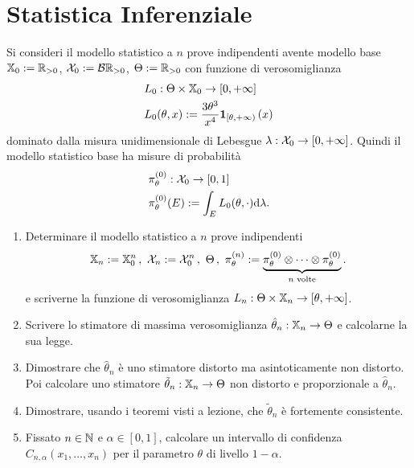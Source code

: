 

\section{Statistica Inferenziale}

\begin{esercizio}
  Si consideri il modello statistico a $n$ prove indipendenti avente modello base $\mathbb X_0 := \mathbb R_{> 0}$, $\mathcal X_0 := \mathcal B \mathbb R_{> 0}$, $\Theta := \mathbb R_{>0}$ con funzione di verosomiglianza
\begin{align*}
  & L_0 : \Theta \times \mathbb X_0 \to [0, +\infty] \\
  & L_0(\theta, x) := \frac{3 \theta^3}{x^4} \mathbf 1_{[\theta, +\infty)}\left(x\right)
\end{align*}
dominato dalla misura unidimensionale di Lebesgue $\lambda : \mathcal X_0 \to [0, +\infty]$. Quindi il modello statistico base ha misure di probabilità
\begin{align*}
  & \pi_\theta^{(0)} : \mathcal X_0 \to [0, 1] \\
  & \pi_\theta^{(0)}(E) := \int_E L_0(\theta,\cdot) \mathrm d\lambda .
\end{align*}
\begin{enumerate}[leftmargin=*]
\item Determinare il modello statistico a $n$ prove indipendenti
\[
	\mbb X_n := \mbb X_0^n\,,\ \mcal X_n := \mcal X_0^n\,,\ \Theta \,,\ \pi_\theta^{(n)} := \underbrace{\pi_\theta^{(0)} \otimes \cdots \otimes \pi_\theta^{(0)}}_{n \text{ volte}} .
\]
e scriverne la funzione di verosomiglianza $L_n : \Theta \times \mathbb X_n \to [\theta, +\infty]$.

\item Scrivere lo stimatore di massima verosomiglianza $\hat\theta_n : \mathbb X_n \to \Theta$ e calcolarne la sua legge.

\item Dimostrare che $\hat\theta_n$ è uno stimatore distorto ma asintoticamente non distorto. Poi calcolare uno stimatore $\tilde\theta_n : \mathbb X_n \to \Theta$ non distorto e proporzionale a $\hat\theta_n$.

\item Dimostrare, usando i teoremi visti a lezione, che $\tilde\theta_n$ è fortemente consistente.

\item Fissato $n \in \mathbb N$ e $\alpha \in [0, 1]$, calcolare un intervallo di confidenza $C_{n, \alpha}(x_1, \dots, x_n)$ per il parametro $\theta$ di livello $1-\alpha$.
\end{enumerate}
\end{esercizio}

